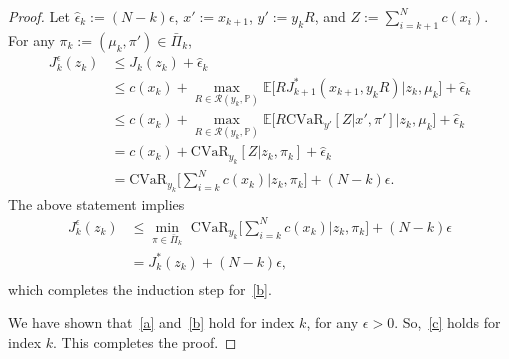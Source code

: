 \documentclass[letterpaper, 10 pt, conference]{ieeeconf}  %
\begin{document}
\begin{proof}
Let $\hat{\epsilon}_k := (N-k)\epsilon$, $x':=x_{k+1}$, $y' := y_kR$, and $Z := \sum_{i=k+1}^N c(x_i)$. For any $\pi_k := (\mu_k, \pi') \in \bar{\Pi}_k$,
%
\begin{equation*}\begin{aligned}
J_k^\epsilon(z_k) & \leq J_k(z_k) + \hat{\epsilon}_k \\
& \leq c(x_k) + {\underset{R \in \mathcal{R}(y_k, \mathbb{P})}\max} \mathbb{E}\big[ RJ_{k+1}^*(x_{k+1},y_kR) \big| z_k, \mu_k \big] + \hat{\epsilon}_k\\
& \leq c(x_k) + {\underset{R \in \mathcal{R}(y_k, \mathbb{P})}\max} \mathbb{E}\big[ R\text{CVaR}_{y'} [Z|x', \pi' ] \big| z_k, \mu_k \big] + \hat{\epsilon}_k\\
& = c(x_k) + \text{CVaR}_{y_k}[Z|z_k, \pi_k] + \hat{\epsilon}_k\\
& = \text{CVaR}_{y_k}\big[\textstyle \sum_{i=k}^N c(x_k)|z_k, \pi_k\big] + (N-k)\epsilon.
\end{aligned}\end{equation*}
%
The above statement implies
%
\begin{equation*}\begin{aligned}
J_k^\epsilon(z_k) & \leq {\underset{\pi \in \bar{\Pi}_k} \min} \text{ CVaR}_{y_k}\big[\textstyle \sum_{i=k}^N c(x_k)|z_k, \pi_k\big] + (N-k)\epsilon \\
& = J_k^*(z_k) + (N-k)\epsilon, \\
\end{aligned}\end{equation*}
%
which completes the induction step for~\eqref{b}. 

We have shown that~\eqref{a} and~\eqref{b} hold for index $k$, for any $\epsilon>0$. So,~\eqref{c} holds for index $k$. 
This completes the proof.
\end{proof}
\addtolength{\textheight}{-2cm}   %


\end{document}
